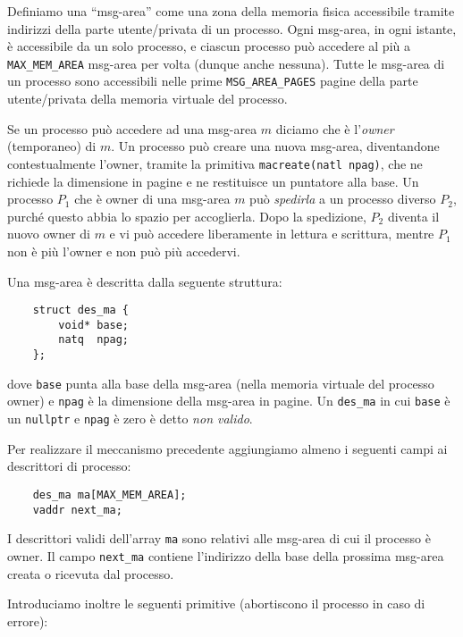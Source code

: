 Definiamo una ``msg-area'' come una zona della memoria fisica accessibile tramite indirizzi della parte utente/privata di un processo.
Ogni msg-area, in ogni istante, \`e accessibile da un solo processo, e ciascun processo pu\`o accedere al pi\`u a \verb|MAX_MEM_AREA| msg-area per volta
(dunque anche nessuna).  
Tutte le msg-area di un processo sono accessibili nelle prime \verb|MSG_AREA_PAGES| pagine
della parte utente/privata della memoria virtuale del processo.

Se un processo pu\`o accedere ad una msg-area $m$ diciamo che \`e l'{\em owner} (temporaneo) di $m$.
Un processo pu\`o creare una nuova msg-area, diventandone contestualmente l'owner, tramite la primitiva \verb|macreate(natl npag)|, che 
ne richiede la dimensione in pagine e ne restituisce
un puntatore alla base. Un processo $P_1$ che \`e owner di una msg-area $m$ pu\`o {\em spedirla} a un processo diverso $P_2$, purch\'e
questo abbia lo spazio per accoglierla. Dopo la spedizione, $P_2$ diventa il nuovo owner di $m$ e vi pu\`o accedere liberamente
in lettura e scrittura, mentre $P_1$ non \`e pi\`u l'owner e non pu\`o pi\`u accedervi.

Una msg-area \`e descritta dalla seguente struttura:
\begin{verbatim}
    struct des_ma {
        void* base;
        natq  npag;
    };
\end{verbatim}
dove \verb|base| punta alla base della msg-area (nella memoria virtuale del processo owner) e \verb|npag| \`e la dimensione della msg-area
in pagine.  Un \verb|des_ma| in cui \verb|base| \`e un \verb|nullptr| e \verb|npag| \`e zero \`e detto {\em non valido}.

Per realizzare il meccanismo precedente aggiungiamo almeno i seguenti campi ai descrittori di processo:
\begin{verbatim}
    des_ma ma[MAX_MEM_AREA];
    vaddr next_ma;
\end{verbatim}
I descrittori validi dell'array \verb|ma| sono relativi alle msg-area di cui il processo \`e owner. Il campo
\verb|next_ma| contiene l'indirizzo della base della prossima msg-area creata o ricevuta dal processo.

Introduciamo inoltre le seguenti primitive (abortiscono il processo in caso di errore):

